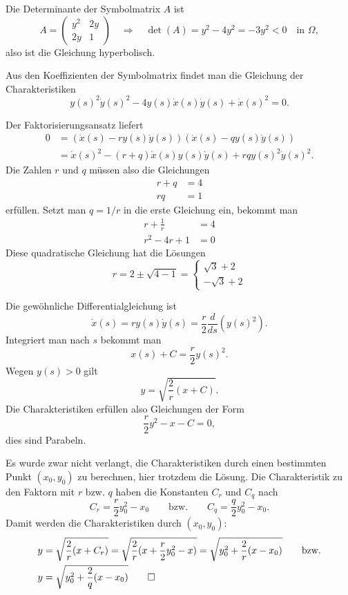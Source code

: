 \begin{loesung}
\begin{teilaufgaben}
\item
Die Determinante der Symbolmatrix $A$ ist
\[
A=\begin{pmatrix}
y^2&2y\\
2y&1
\end{pmatrix}
\quad\Rightarrow\quad
\det (A)=y^2-4y^2=-3y^2<0 \quad\text{in $\Omega$},
\]
also ist die Gleichung hyperbolisch.
\item
Aus den Koeffizienten der Symbolmatrix findet man die Gleichung
der Charakteristiken
\[
y(s)^2\dot y(s)^2-4y(s)\dot x(s)\dot y(s)+\dot x(s)^2=0.
\]
\item
Der Faktorisierungsansatz liefert
\begin{align*}
0&=(\dot x(s)-ry(s)\dot y(s))(\dot x(s)-qy(s)\dot y(s))
\\
&=\dot x(s)^2-(r+q)\dot x(s) y(s)\dot y(s)+rqy(s)^2\dot y(s)^2.
\end{align*}
Die Zahlen $r$ und $q$ müssen also die Gleichungen
\begin{align*}
r+q&=4\\
rq&=1
\end{align*}
erfüllen. Setzt man $q=1/r$ in die erste Gleichung ein, bekommt man
\begin{align*}
r+\frac1r&=4\\
r^2-4r+1&=0
\end{align*}
Diese quadratische Gleichung hat die Lösungen
\[
r
=
2\pm\sqrt{4-1}
=
\begin{cases}
\sqrt{3}+2\\
-\sqrt{3}+2
\end{cases}
\]
\item
Die gewöhnliche Differentialgleichung ist
\[
\dot x(s)=ry(s)\dot y(s)=\frac{r}{2}\frac{d}{ds}(y(s)^2).
\]
Integriert man nach $s$ bekommt man
\[
x(s) + C=\frac{r}{2}y(s)^2.
\]
Wegen $y(s)>0$ gilt
\[
y = \sqrt{\frac{2}{r}(x+C)}.
\]
Die Charakteristiken erfüllen also Gleichungen der Form
\[
\frac{r}2y^2-x-C=0,
\]
dies sind Parabeln.
\end{teilaufgaben}
Es wurde zwar nicht verlangt, die Charakteristiken durch einen
bestimmten Punkt $(x_0,y_0)$ zu berechnen, hier trotzdem die
Lösung. Die Charakteristik zu den Faktorn mit $r$ bzw. $q$ haben
die Konstanten $C_r$ und $C_q$ nach
\[
C_r=\frac{r}{2}y_0^2-x_0
\qquad
\text{bzw.}
\qquad
C_q=\frac{q}{2}y_0^2-x_0.
\]
Damit werden die Charakteristiken durch $(x_0,y_0)$:
\begin{align*}
y&=\sqrt{
\frac2r(x+C_r)
}
=
\sqrt{
\frac2r(x+
\frac{r}{2}y_0^2-x
)
}
=\sqrt{y_0^2+\frac2r(x-x_0)}
\qquad\text{bzw.}
\\
y&
=\sqrt{y_0^2+\frac2q(x-x_0)}
\qedhere
\end{align*}
\end{loesung}
